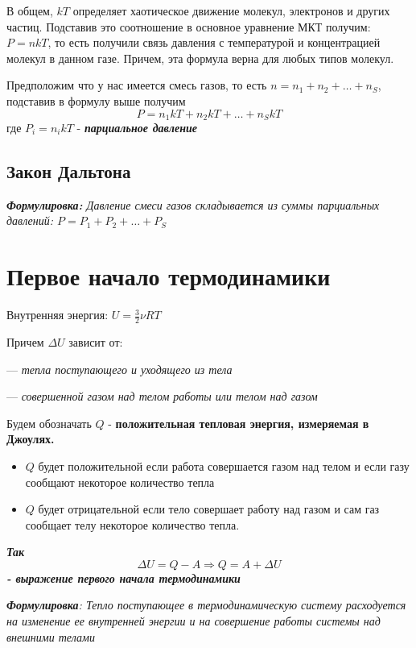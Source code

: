 \documentclass[12pt,a4paper]{report}
\begin{document}
\vspace{5px}

В общем, $kT$ определяет хаотическое движение молекул, электронов и других частиц. Подставив это соотношение в основное уравнение МКТ получим: $P = nkT$, то есть получили связь давления с температурой и концентрацией молекул в данном газе. Причем, эта формула верна для любых типов молекул.

Предположим что у нас имеется смесь газов, то есть $n = n_1 + n_2 + \ldots + n_S$, подставив в формулу выше получим
\[ P = n_1kT + n_2kT + \ldots + n_SkT\]
где $P_i = n_ikT$ - \textbf{\textit{парциальное давление}}
\subsection{Закон Дальтона}
\textit{\textbf{Формулировка:} Давление смеси газов складывается из суммы парциальных давлений: $P = P_1 +P_2 + \ldots + P_S$}
\section{Первое начало термодинамики}
Внутренняя энергия: $ U = \frac{3}{2} \nu R T$

\vspace{5px}

Причем $ \Delta U $ зависит от:

\vspace{5px}

--- \textit{тепла поступающего и уходящего из тела}

--- \textit{совершенной газом над телом работы или телом над газом}

\vspace{5px}

Будем обозначать $Q$ - \textbf{положительная тепловая энергия, измеряемая в Джоулях.}
\begin{itemize}
    \item $Q$ будет положительной если работа совершается газом над телом и если газу сообщают некоторое количество тепла
    \item $Q$ будет отрицательной если тело совершает работу над газом и сам газ сообщает телу некоторое количество тепла.
\end{itemize}
\textbf{\textit{Так \[ \Delta U = Q - A \Rightarrow Q = A + \Delta U\]
        - выражение первого начала термодинамики}}

\vspace{6px}

\textit{\textbf{Формулировка}: Тепло поступающее в термодинамическую систему расходуется на изменение ее внутренней энергии и на совершение работы системы над внешними телами}
\end{document}
